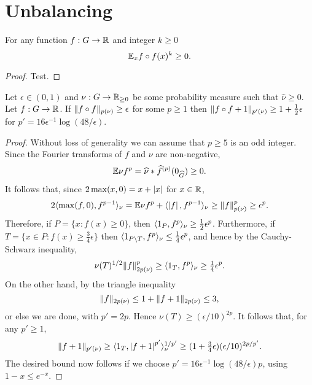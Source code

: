 \chapter{Unbalancing}

\begin{lemma}
\label{nonneg_moments}
\leanok
For any function $f:G\to\mathbb{R}$ and integer $k\geq 0$
\[\mathbb{E}_x f\circ f(x)^k\geq 0.\]
\end{lemma}
\begin{proof}
\leanok
Test.
\end{proof}

\begin{lemma}
\label{unbalancing}
\leanok
Let $\epsilon\in(0,1)$ and $\nu:G\to\mathbb{R}_{\geq 0}$ be some probability measure such that $\widehat{\nu}\geq 0$. Let $f:G\to\mathbb{R}$. If $\lVert f\circ f\rVert_{p(\nu)}\geq \epsilon$ for some $p\geq 1$ then $\lVert f\circ f+1\rVert_{p'(\nu)}\geq 1+\tfrac{1}{2}\epsilon$ for $p'=16\epsilon^{-1}\log(48/\epsilon)$.
\end{lemma}

\begin{proof}
Without loss of generality we can assume that $p\geq 5$ is an odd integer. %
Since the Fourier transforms of $f$ and $\nu$ are non-negative,
\[\mathbb{E} \nu f^{p}= \widehat{\nu}\ast\widehat{f}^{(p)}(0_{\widehat{G}})\geq 0.\]
It follows that, since $2\max(x,0)=x+\left\lvert x\right\rvert$ for $x\in\mathbb{R}$,
\[2\langle \max(f,0),f^{p-1}\rangle_\nu=\mathbb{E} \nu f^{p}+\langle \left\lvert f\right\rvert,f^{p-1}\rangle_\nu\geq \lVert f\rVert_{p(\nu)}^p\geq \epsilon^p.\]
Therefore, if $P=\{ x : f(x) \geq 0\}$, then $\langle 1_{P},f^{p}\rangle_\nu\geq \frac{1}{2}\epsilon^{p}$. Furthermore, if $T=\{ x\in P : f(x) \geq \tfrac{3}{4}\epsilon\}$ then $\langle 1_{P\backslash T},f^p\rangle_\nu \leq \tfrac{1}{4}\epsilon^{p}$, and hence by the Cauchy-Schwarz inequality,
\[\nu(T)^{1/2}\lVert f\rVert_{2p(\nu)}^{p}\geq \langle 1_{T}, f^{p}\rangle_\nu \geq \tfrac{1}{4}\epsilon^{p}.\]
On the other hand, by the triangle inequality
\[\lVert f\rVert_{2p(\nu)}\leq 1+\lVert f+1\rVert_{2p(\nu)}\leq 3,\]
or else we are done, with $p'=2p$. Hence $\nu(T)\geq (\epsilon/10)^{2p}$. It follows that, for any $p'\geq 1$,
\[\lVert f+1\rVert_{p'(\nu)}\geq \langle 1_{T},\left\lvert f+1\right\rvert^{p'}\rangle_\nu^{1/p'}\geq  (1+\tfrac{3}{4}\epsilon)(\epsilon/10)^{2p/p'}.\]
The desired bound now follows if we choose $p'=16\epsilon^{-1}\log(48/\epsilon)p$, using $1-x\leq e^{-x}$.
\end{proof}
